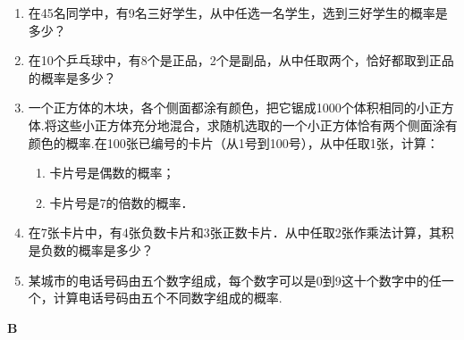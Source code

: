 \begin{enumerate}
    \item 在45名同学中，有9名三好学生，从中任选一名学生，选到三好学生的概率是多少？
    \item 在10个乒乓球中，有8个是正品，2个是副品，从中任取两个，恰好都取到正品的概率是多少？
    \item 一个正方体的木块，各个侧面都涂有颜色，把它锯成1000个体积相同的小正方体.将这些小正方体充分地混合，求随机选取的一个小正方体恰有两个侧面涂有颜色的概率.在100张已编号的卡片（从1号到100号），从中任取1张，计算：
\begin{enumerate}[(1)]
    \item 卡片号是偶数的概率；
    \item 卡片号是7的倍数的概率．
\end{enumerate}

    \item  在7张卡片中，有4张负数卡片和3张正数卡片．从中任取2张作乘法计算，其积是负数的概率是多少？
    \item  某城市的电话号码由五个数字组成，每个数字可以是0到9这十个数字中的任一个，计算电话号码由五个不同数字组成的概率.
\end{enumerate}

\begin{center}
    \bfseries B
\end{center}

